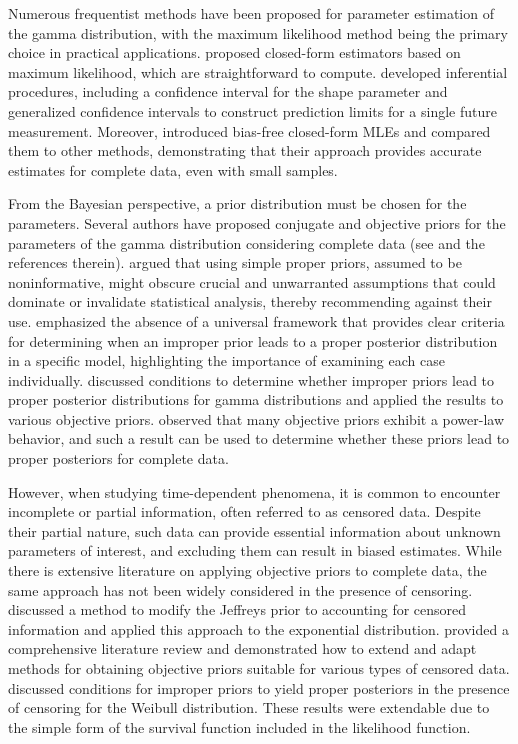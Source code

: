 \documentclass[12pt]{article} %
\theoremstyle{plain}%
\theoremstyle{definition}
\theoremstyle{remark}
\begin{document}
Numerous frequentist methods have been proposed for parameter estimation of the gamma distribution, with the maximum likelihood method being the primary choice in practical applications.  \cite{ye2017closed} proposed closed-form estimators based on maximum likelihood, which are straightforward to compute.  \cite{wang2018inference} developed inferential procedures, including a confidence interval for the shape parameter and generalized confidence intervals to construct prediction limits for a single future measurement. Moreover,  \cite{louzada2019note} introduced bias-free closed-form MLEs and compared them to other methods, demonstrating that their approach provides accurate estimates for complete data, even with small samples.

From the Bayesian perspective, a prior distribution must be chosen for the parameters. Several authors have proposed conjugate and objective priors for the parameters of the gamma distribution considering complete data (see  \cite{son2006bayesian} and the references therein). \cite{bernardo2005} argued that using simple proper priors, assumed to be noninformative, might obscure crucial and unwarranted assumptions that could dominate or invalidate statistical analysis, thereby recommending against their use. \cite{northrop2016} emphasized the absence of a universal framework that provides clear criteria for determining when an improper prior leads to a proper posterior distribution in a specific model, highlighting the importance of examining each case individually.  \cite{ramos2021posterior} discussed conditions to determine whether improper priors lead to proper posterior distributions for gamma distributions and applied the results to various objective priors. \cite{ramos2020power} observed that many objective priors exhibit a power-law behavior, and such a result can be used to determine whether these priors lead to proper posteriors for complete data.


However, when studying time-dependent phenomena, it is common to encounter incomplete or partial information, often referred to as censored data. Despite their partial nature, such data can provide essential information about unknown parameters of interest, and excluding them can result in biased estimates. While there is extensive literature on applying objective priors to complete data, the same approach has not been widely considered in the presence of censoring.  \cite{de2001jeffreys} discussed a method to modify the Jeffreys prior to accounting for censored information and applied this approach to the exponential distribution. \cite{tian2022specifying} provided a comprehensive literature review and demonstrated how to extend and adapt methods for obtaining objective priors suitable for various types of censored data. \cite{ramos2020posterior} discussed conditions for improper priors to yield proper posteriors in the presence of censoring for the Weibull distribution. These results were extendable due to the simple form of the survival function included in the likelihood function.
\end{document}
